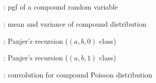 \subsection*{}
\item {}: pgf of a compound random variable
\item {}: mean and variance of compound distribution
\item {}: Panjer's recursion (\((a,b,0)\) class)
\item {}: Panjer's recursion (\((a,b,1)\) class)
\item {}: convolution for compound Poisson distribution
